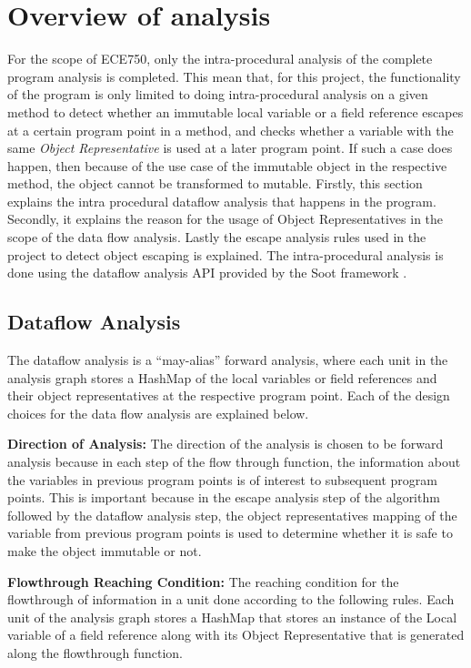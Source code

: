 \section{Overview of analysis}\label{sec:analysis}
For the scope of ECE750, only the intra-procedural analysis of the complete program analysis is completed. This mean that, for this project, the functionality of the program is only limited to doing intra-procedural analysis on a given method to detect whether an immutable local variable or a field reference escapes at a certain program point in a method, and checks whether a variable with the same \textit{Object Representative} is used at a later program point. If such a case does happen, then because of the use case of the immutable object in the respective method, the object cannot be transformed to mutable. Firstly, this section explains the intra procedural dataflow analysis that happens in the program. Secondly, it explains the reason for the usage of Object Representatives \cite{ref:or} in the scope of the data flow analysis. Lastly the escape analysis rules used in the project to detect object escaping is explained. The intra-procedural analysis is done using the dataflow analysis API provided by the Soot framework \citep{ref:Soot}.

\subsection{Dataflow Analysis}\label{sec:dataflow}
The dataflow analysis is a ``may-alias'' forward analysis, where each unit in the analysis graph stores a HashMap of the local variables or field references and their object representatives at the respective program point. Each of the design choices for the data flow analysis are explained below.

\textbf{Direction of Analysis:} The direction of the analysis is chosen to be forward analysis because in each step of the flow through function, the information about the variables in previous program points is of interest to subsequent program points. This is important because in the escape analysis step of the algorithm followed by the dataflow analysis step, the object representatives mapping of the variable from previous program points is used to determine whether it is safe to make the object immutable or not.

\textbf{Flowthrough Reaching Condition:} The reaching condition for the flowthrough of information in a unit done according to the following rules. Each unit of the analysis graph stores a HashMap that stores an instance of the Local variable of a field reference along with its Object Representative that is generated along the flowthrough function.
\vspace{5mm}

